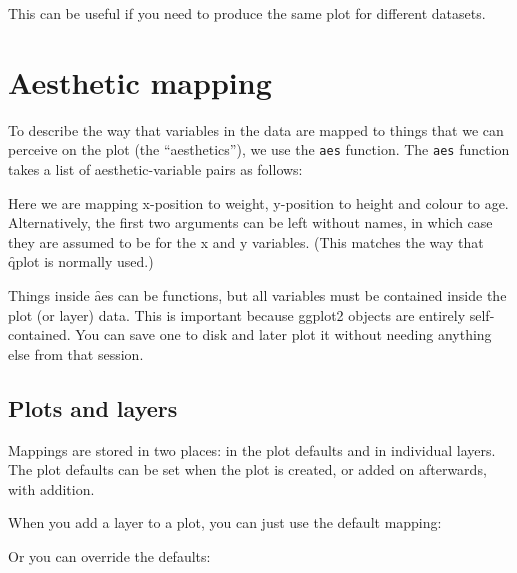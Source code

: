 \noindent This can be useful if you need to produce the same plot for different datasets.

\section{Aesthetic mapping}
\label{sec:aes}

To describe the way that variables in the data are mapped to things that we can perceive on the plot (the ``aesthetics''), we use the {\tt aes} function.  The {\tt aes} function takes a list of aesthetic-variable pairs as follows:

% 


Here we are mapping x-position to weight, y-position to height and colour to age.  Alternatively, the first two arguments can be left without names, in which case they are assumed to be for the x and y variables.  (This matches the way that \f{qplot} is normally used.)

% 


Things inside \f{aes} can be functions, but all variables must be contained inside the plot (or layer) data.  This is important because ggplot2 objects are entirely self-contained.  You can save one to disk and later plot it without needing anything else from that session.

\subsection{Plots and layers}
\label{sub:plots_and_layers}

Mappings are stored in two places: in the plot defaults and in individual layers.  The plot defaults can be set when the plot is created, or added on afterwards, with addition.

% 


When you add a layer to a plot, you can just use the default mapping: 

% 


Or you can override the defaults:

